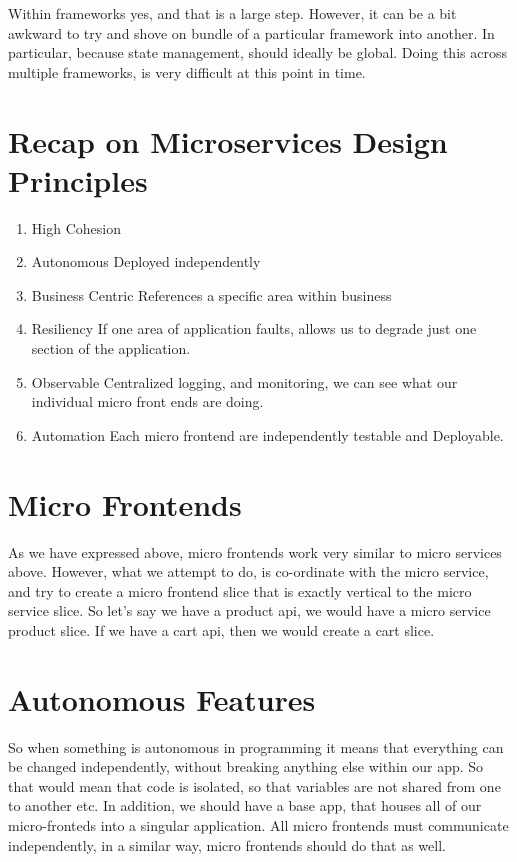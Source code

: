 Within frameworks yes, and that is a large step. However, it can be a bit awkward to try and shove on bundle of a particular framework into another. In particular, because state management, should ideally be global. Doing this across multiple frameworks, is very difficult at this point in time. 

\section{Recap on Microservices Design Principles}
\begin{enumerate}
  \item High Cohesion 
  \item Autonomous 
Deployed independently 
  \item Business Centric
References a specific area within business 
  \item Resiliency 
If one area of application faults, allows us to degrade just one section of the application. 
  \item Observable 
Centralized logging, and monitoring, we can see what our individual micro front ends are doing.
  \item Automation 
Each micro frontend are independently testable and Deployable. 
\end{enumerate}

\section{Micro Frontends}
As we have expressed above, micro frontends work very similar to micro services above. However, what we attempt to do, is co-ordinate with the micro service, and try to create a micro frontend slice that is exactly vertical to the micro service slice. So let's say we have a product api, we would have a micro service product slice. If we have a cart api, then we would create a cart slice. 

\section{Autonomous Features}
So when something is autonomous in programming it means that everything can be changed independently, without breaking anything else within our app. So that would mean that code is isolated, so that variables are not shared from one to another etc. In addition, we should have a base app, that houses all of our micro-fronteds into a singular application. All micro frontends must communicate independently, in a similar way, micro frontends should do that as well. 

